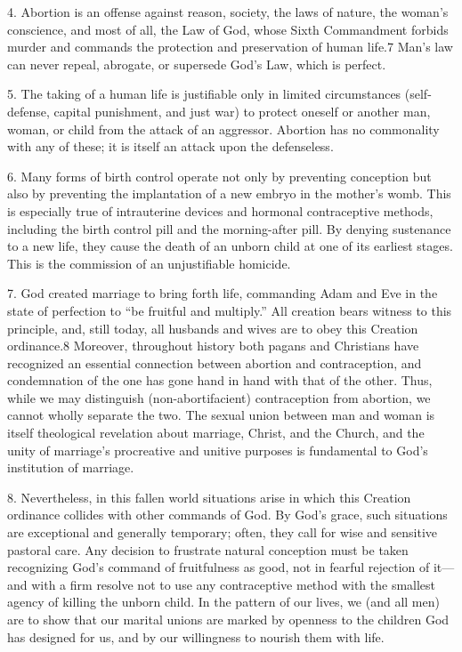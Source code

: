 \documentclass[
]{book}
\begin{document}
\protect\hypertarget{dda-statement-04}{\href{}{}}4. Abortion is an offense against reason, society, the laws of nature, the woman's conscience, and most of all, the Law of God, whose Sixth Commandment forbids murder and commands the protection and preservation of human life.7 Man's law can never repeal, abrogate, or supersede God's Law, which is perfect.

\protect\hypertarget{dda-statement-05}{\href{}{}}5. The taking of a human life is justifiable only in limited circumstances (self-defense, capital punishment, and just war) to protect oneself or another man, woman, or child from the attack of an aggressor. Abortion has no commonality with any of these; it is itself an attack upon the defenseless.

\protect\hypertarget{dda-statement-06}{\href{}{}}6. Many forms of birth control operate not only by preventing conception but also by preventing the implantation of a new embryo in the mother's womb. This is especially true of intrauterine devices and hormonal contraceptive methods, including the birth control pill and the morning-after pill. By denying sustenance to a new life, they cause the death of an unborn child at one of its earliest stages. This is the commission of an unjustifiable homicide.

\protect\hypertarget{dda-statement-07}{\href{}{}}7. God created marriage to bring forth life, commanding Adam and Eve in the state of perfection to ``be fruitful and multiply.'' All creation bears witness to this principle, and, still today, all husbands and wives are to obey this Creation ordinance.8 Moreover, throughout history both pagans and Christians have recognized an essential connection between abortion and contraception, and condemnation of the one has gone hand in hand with that of the other. Thus, while we may distinguish (non-abortifacient) contraception from abortion, we cannot wholly separate the two. The sexual union between man and woman is itself theological revelation about marriage, Christ, and the Church, and the unity of marriage's procreative and unitive purposes is fundamental to God's institution of marriage.

\protect\hypertarget{dda-statement-08}{\href{}{}}8. Nevertheless, in this fallen world situations arise in which this Creation ordinance collides with other commands of God. By God's grace, such situations are exceptional and generally temporary; often, they call for wise and sensitive pastoral care. Any decision to frustrate natural conception must be taken recognizing God's command of fruitfulness as good, not in fearful rejection of it---and with a firm resolve not to use any contraceptive method with the smallest agency of killing the unborn child. In the pattern of our lives, we (and all men) are to show that our marital unions are marked by openness to the children God has designed for us, and by our willingness to nourish them with life.
\end{document}
